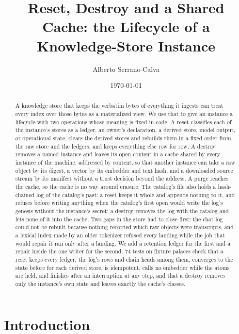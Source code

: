 \documentclass[11pt]{article}
\title{Reset, Destroy and a Shared Cache: the Lifecycle of a Knowledge-Store Instance}
\author{Alberto Serrano-Calva}
\date{\today}
\theoremstyle{plain}
\theoremstyle{definition}
\theoremstyle{remark}
\newcommand{\ntests}{74}
\begin{document}
\maketitle

\begin{abstract}
A knowledge store that keeps the verbatim bytes of everything it ingests can treat every index over
those bytes as a materialized view. We use that to give an instance a lifecycle with two operations
whose meaning is fixed in code. A reset classifies each of the instance's stores as a ledger, an
owner's declaration, a derived store, model output, or operational state, clears the derived stores
and rebuilds them in a fixed order from the raw store and the ledgers, and keeps everything else row
for row. A destroy removes a named instance and leaves its open content in a cache shared by every
instance of the machine, addressed by content, so that another instance can take a raw object by its
digest, a vector by its embedder and text hash, and a downloaded source stream by its manifest
without a trust decision beyond the address. A purge reaches the cache, so the cache is no way
around erasure. The catalog's file also holds a hash-chained log of the catalog's past: a reset
keeps it whole and appends nothing to it, and refuses before writing anything when the catalog's
first open would write the log's genesis without the instance's secret; a destroy removes the log
with the catalog and lets none of it into the cache. Two gaps in the store had to close first: the
chat log could not be rebuilt because nothing recorded which raw objects were transcripts, and a
lexical index made by an older tokenizer refused every landing while the job that would repair it
ran only after a landing. We add a retention ledger for the first and a repair inside the one
writer for the second. \ntests{} tests on
fixture palaces check that a reset keeps every ledger, the log's rows and chain heads among them,
converges to the state before for each derived store, is idempotent, calls no embedder while the
atoms are held, and finishes after an interruption at any step, and that a destroy removes only
the instance's own state and leaves exactly the cache's classes.
\end{abstract}

\section{Introduction}
\end{document}
